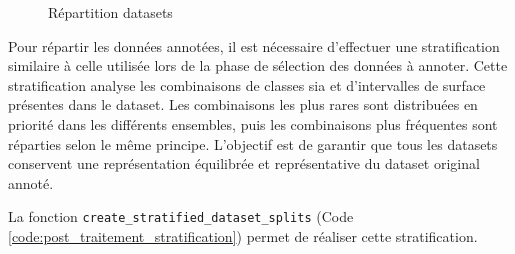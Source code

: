 \begin{figure}[H]
    \centering
    \caption{Répartition datasets}
    \label{fig:ch3_postprocessing_dataset_06_kfold}
\end{figure}

Pour répartir les données annotées, il est nécessaire d'effectuer une stratification similaire à celle utilisée lors de la phase de sélection des données à annoter. Cette stratification analyse les combinaisons de classes \gls{sia} et d'intervalles de surface présentes dans le dataset. Les combinaisons les plus rares sont distribuées en priorité dans les différents ensembles, puis les combinaisons plus fréquentes sont réparties selon le même principe. L'objectif est de garantir que tous les datasets conservent une représentation équilibrée et représentative du dataset original annoté.

La fonction \texttt{create\_stratified\_dataset\_splits} (Code \ref{code:post_traitement_stratification}) permet de réaliser cette stratification.

